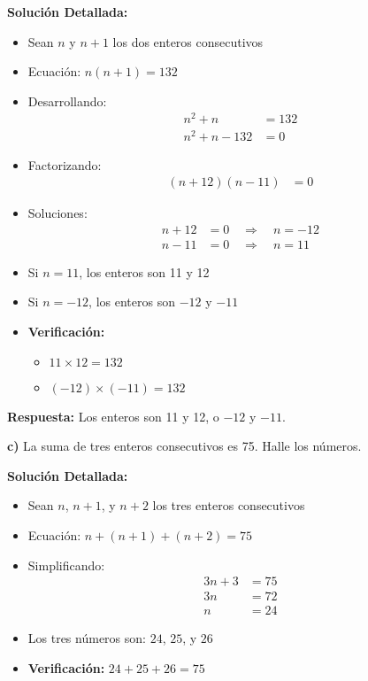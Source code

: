 \textbf{Solución Detallada:}
\begin{itemize}
    \item Sean $n$ y $n+1$ los dos enteros consecutivos
    \item Ecuación: $n(n+1) = 132$
    \item Desarrollando:
    \begin{align*}
    n^2 + n &= 132 \\
    n^2 + n - 132 &= 0
    \end{align*}
    \item Factorizando:
    \begin{align*}
    (n + 12)(n - 11) &= 0
    \end{align*}
    \item Soluciones:
    \begin{align*}
    n + 12 &= 0 \quad \Rightarrow \quad n = -12 \\
    n - 11 &= 0 \quad \Rightarrow \quad n = 11
    \end{align*}
    \item Si $n = 11$, los enteros son 11 y 12
    \item Si $n = -12$, los enteros son $-12$ y $-11$
    \item \textbf{Verificación:}
    \begin{itemize}
        \item $11 \times 12 = 132$ \checkmark
        \item $(-12) \times (-11) = 132$ \checkmark
    \end{itemize}
\end{itemize}

\textbf{Respuesta:} Los enteros son 11 y 12, o $-12$ y $-11$.

\medskip

\textbf{c)} La suma de tres enteros consecutivos es 75. Halle los números.

\textbf{Solución Detallada:}
\begin{itemize}
    \item Sean $n$, $n+1$, y $n+2$ los tres enteros consecutivos
    \item Ecuación: $n + (n+1) + (n+2) = 75$
    \item Simplificando:
    \begin{align*}
    3n + 3 &= 75 \\
    3n &= 72 \\
    n &= 24
    \end{align*}
    \item Los tres números son: $24$, $25$, y $26$
    \item \textbf{Verificación:} $24 + 25 + 26 = 75$ \checkmark
\end{itemize}

